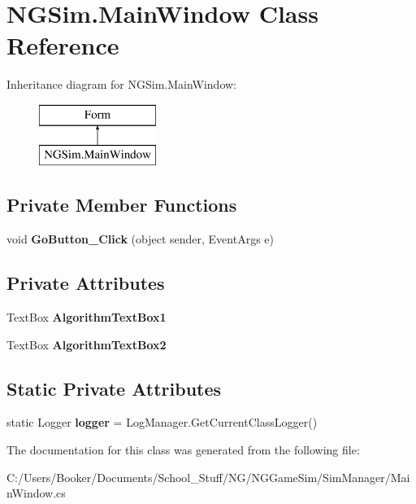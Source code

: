 \hypertarget{class_n_g_sim_1_1_main_window}{}\section{N\+G\+Sim.\+Main\+Window Class Reference}
\label{class_n_g_sim_1_1_main_window}
Inheritance diagram for N\+G\+Sim.\+Main\+Window\+:\begin{figure}[H]
\begin{center}
\leavevmode
\includegraphics[height=2.000000cm]{class_n_g_sim_1_1_main_window}
\end{center}
\end{figure}
\subsection*{Private Member Functions}
\begin{DoxyCompactItemize}
\item 
\mbox{\label{class_n_g_sim_1_1_main_window_aac1557a276c3ff4e3627c269f5a9229f}} 
void {\bfseries Go\+Button\+\_\+\+Click} (object sender, Event\+Args e)
\end{DoxyCompactItemize}
\subsection*{Private Attributes}
\begin{DoxyCompactItemize}
\item 
\mbox{\label{class_n_g_sim_1_1_main_window_ab60587dd59aa3aed753df6b8baed7d21}} 
Text\+Box {\bfseries Algorithm\+Text\+Box1}
\item 
\mbox{\label{class_n_g_sim_1_1_main_window_ab66ca06886257e343fe3fd56dc91a94a}} 
Text\+Box {\bfseries Algorithm\+Text\+Box2}
\end{DoxyCompactItemize}
\subsection*{Static Private Attributes}
\begin{DoxyCompactItemize}
\item 
\mbox{\label{class_n_g_sim_1_1_main_window_a4534af65d27399c3e35c4ebe1b165a77}} 
static Logger {\bfseries logger} = Log\+Manager.\+Get\+Current\+Class\+Logger()
\end{DoxyCompactItemize}


The documentation for this class was generated from the following file\+:\begin{DoxyCompactItemize}
\item 
C\+:/\+Users/\+Booker/\+Documents/\+School\+\_\+\+Stuff/\+N\+G/\+N\+G\+Game\+Sim/\+Sim\+Manager/Main\+Window.\+cs\end{DoxyCompactItemize}
